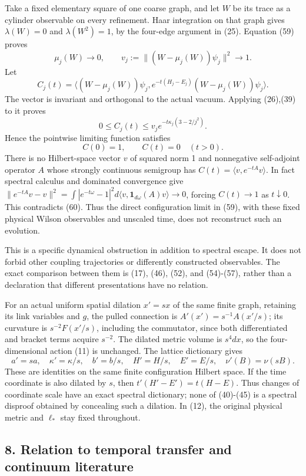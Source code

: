 \documentclass[
  11pt,
]{article}
\begin{document}
Take a fixed elementary square of one coarse graph, and let \(W\) be its
trace as a cylinder observable on every refinement. Haar integration on
that graph gives \(\lambda(W)=0\) and \(\lambda(W^2)=1\), by the
four-edge argument in (25). Equation (59) proves \[
 \mu_j(W)\longrightarrow0,\qquad
 v_j:=\|(W-\mu_j(W))\psi_j\|^2\longrightarrow1.
\] Let \[
 C_j(t)=\langle(W-\mu_j(W))\psi_j,
 e^{-t(H_j-E_j)}(W-\mu_j(W))\psi_j\rangle.
\] The vector is invariant and orthogonal to the actual vacuum. Applying
(26),(39) to it proves \[
 0\le C_j(t)\le v_j e^{-t\kappa_j(3-2/j^2)}.
\] Hence the pointwise limiting function satisfies \[
 C(0)=1,\qquad C(t)=0\quad(t>0).
\tag{60}
\] There is no Hilbert-space vector \(v\) of squared norm 1 and
nonnegative self-adjoint operator \(A\) whose strongly continuous
semigroup has \(C(t)=\langle v,e^{-tA}v\rangle\). In fact spectral
calculus and dominated convergence give
\(\|e^{-tA}v-v\|^2=\int|e^{-t\omega}-1|^2d\langle v,\mathbf1_{d\omega}(A)v\rangle\to0\),
forcing \(C(t)\to1\) as \(t\downarrow0\). This contradicts (60). Thus
the direct configuration limit in (59), with these fixed physical Wilson
observables and unscaled time, does not reconstruct such an evolution.

This is a specific dynamical obstruction in addition to spectral escape.
It does not forbid other coupling trajectories or differently
constructed observables. The exact comparison between them is (17),
(46), (52), and (54)-(57), rather than a declaration that different
presentations have no relation.

For an actual uniform spatial dilation \(x'=sx\) of the same finite
graph, retaining its link variables and \(g\), the pulled connection is
\(A'(x')=s^{-1}A(x'/s)\); its curvature is \(s^{-2}F(x'/s)\), including
the commutator, since both differentiated and bracket terms acquire
\(s^{-2}\). The dilated metric volume is \(s^4dx\), so the
four-dimensional action (11) is unchanged. The lattice dictionary gives
\[
 a'=sa,\quad\kappa'=\kappa/s,\quad b'=b/s,
 \quad H'=H/s,\quad E'=E/s,\quad
 \nu'(B)=\nu(sB).
\tag{61}
\] These are identities on the same finite configuration Hilbert space.
If the time coordinate is also dilated by \(s\), then
\(t'(H'-E')=t(H-E)\). Thus changes of coordinate scale have an exact
spectral dictionary; none of (40)-(45) is a spectral disproof obtained
by concealing such a dilation. In (12), the original physical metric and
\(\ell_*\) stay fixed throughout.

\subsection{8. Relation to temporal transfer and continuum
literature}\label{relation-to-temporal-transfer-and-continuum-literature}
\end{document}
